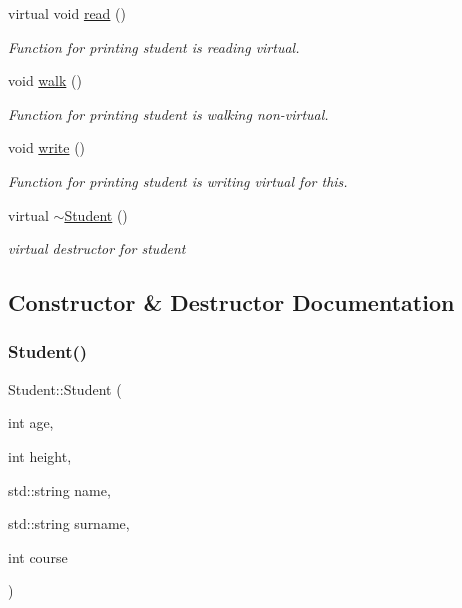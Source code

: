 \begin{DoxyCompactItemize}
\mbox{\label{classStudent_a5e6ffbc94fe74a4346b1a94ded0db106}} 
virtual void \hyperlink{classStudent_a5e6ffbc94fe74a4346b1a94ded0db106}{read} ()
\begin{DoxyCompactList}\small\item\em Function for printing student is reading virtual. \end{DoxyCompactList}\item 
\mbox{\label{classStudent_a1b43e49d7112c4c1b48e44d6cc660439}} 
void \hyperlink{classStudent_a1b43e49d7112c4c1b48e44d6cc660439}{walk} ()
\begin{DoxyCompactList}\small\item\em Function for printing student is walking non-\/virtual. \end{DoxyCompactList}\item 
\mbox{\label{classStudent_a8135ee131b8e83633a15209fccaf8700}} 
void \hyperlink{classStudent_a8135ee131b8e83633a15209fccaf8700}{write} ()
\begin{DoxyCompactList}\small\item\em Function for printing student is writing virtual for this. \end{DoxyCompactList}\item 
\mbox{\label{classStudent_a54a8ea060d6cd04222c3a2f89829f105}} 
virtual \hyperlink{classStudent_a54a8ea060d6cd04222c3a2f89829f105}{$\sim$\+Student} ()
\begin{DoxyCompactList}\small\item\em virtual destructor for student \end{DoxyCompactList}\end{DoxyCompactItemize}


\subsection{Constructor \& Destructor Documentation}
\mbox{\label{classStudent_aa849d9b60484adb7bd3ec7e137ab8d03}} 
\subsubsection{\texorpdfstring{Student()}{Student()}\hspace{0.1cm}{\footnotesize\ttfamily [1/2]}}
{\footnotesize\ttfamily Student\+::\+Student (\begin{DoxyParamCaption}\item[{int}]{age,  }\item[{int}]{height,  }\item[{std\+::string}]{name,  }\item[{std\+::string}]{surname,  }\item[{int}]{course }\end{DoxyParamCaption})}



